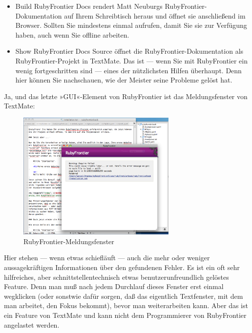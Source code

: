 \documentclass[11pt]{report}
\begin{document}
\begin{itemize}
\item Build RubyFrontier Docs rendert Matt Neuburgs
  RubyFrontier-Dokumentation auf Ihrem Schreibtisch heraus und öffnet
  sie anschließend im Browser. Sollten Sie mindestens einmal aufrufen,
  damit Sie sie zur Verfügung haben, auch wenn Sie offline arbeiten.
\end{itemize}


\begin{itemize}
\item Show RubyFrontier Docs Source öffnet die RubyFrontier-Dokumentation
  als RubyFrontier-Projekt in TextMate. Das ist — wenn Sie mit
  RubyFrontier ein wenig fortgeschritten sind — eines der nützlichsten
  Hilfen überhaupt. Denn hier können Sie nachschauen, wie der Meister
  seine Probleme gelöst hat.
\end{itemize}


Ja, und das letzte »GUI«-Element von RubyFrontier ist das
Meldungsfenster von TextMate:

\begin{figure}[h!]
\centering
\includegraphics[width=0.7\textwidth]{./images/rubyfrontier-meldungsfenster.png}
\caption{\label{rubyfrontier-meldungsfenster}RubyFrontier-Meldungsfenster}
\end{figure}


Hier stehen — wenn etwas schiefläuft — auch die mehr oder weniger
aussagekräftigen Informationen über den gefundenen Fehler. Es ist ein
oft sehr hilfreiches, aber schnittstellentechnisch etwas
benutzerunfreundlich gelöstes Feature. Denn man muß nach jedem
Durchlauf dieses Fenster erst einmal wegklicken (oder sonstwie dafür
sorgen, daß das eigentlich Textfenster, mit dem man arbeitet, den
Fokus bekommt), bevor man weiterarbeiten kann. Aber das ist ein
Feature von TextMate und kann nicht dem Programmierer von RubyFrontier
angelastet werden.
\end{document}
